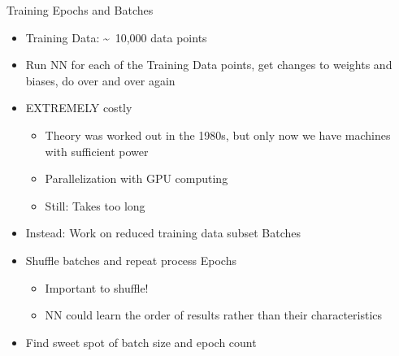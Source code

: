 
\begin{frame}{Training Epochs and Batches}
%
\begin{itemize}
\item Training Data: \textasciitilde~10,000 data points
\item Run NN for each of the Training Data points, get changes to weights and biases, do over and over again
\item[\Thus] EXTREMELY costly
	\begin{itemize}
	\item Theory was worked out in the 1980s, but only now we have machines with sufficient power
	\item Parallelization with GPU computing
	\item Still: Takes too long
	\end{itemize}
\item Instead: Work on reduced training data subset \Thus Batches
\item Shuffle batches and repeat process \Thus Epochs
	\begin{itemize}
	\item Important to shuffle!
	\item NN could learn the order of results rather than their characteristics
	\end{itemize}
\item[\Thus] Find sweet spot of batch size and epoch count
\end{itemize}
%
\end{frame}


